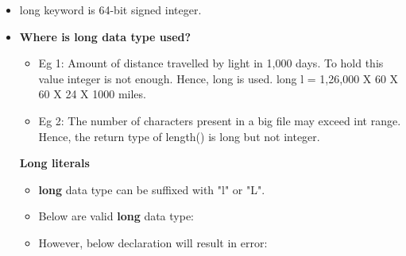 

\begin{flushleft}
	
	\begin{itemize}
		\item long keyword is 64-bit signed integer. 
		
		
		\bigskip
		\item \textbf{Where is long data type used?}
		\begin{itemize}
			\item Eg 1: Amount of distance travelled by light in 1,000 days. To hold this value integer is not enough. Hence, long is used.
			\newline
			long l = 1,26,000 X 60 X 60 X 24 X 1000 miles.
			\bigskip
			\item Eg 2: The number of characters present in a big file may exceed int range. Hence, the return type of length() is long but not integer. 
			
		\end{itemize}	
	
		\bigskip
		\textbf{Long literals}
		\begin{itemize}
			\item \textbf{long} data type can be suffixed with "l" or "L".
			
			\item Below are valid \textbf{long} data type:
			
			\item However, below declaration will result in error:

		\end{itemize}
		
		
	\end{itemize}
	
\end{flushleft}

\newpage

